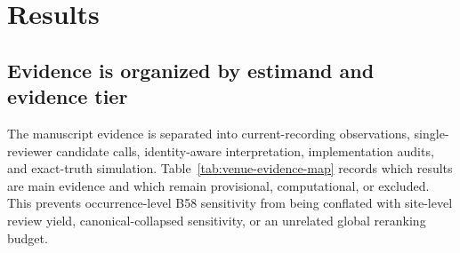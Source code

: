\section{Results}

\subsection{Evidence is organized by estimand and evidence tier}

The manuscript evidence is separated into current-recording observations,
single-reviewer candidate calls, identity-aware interpretation, implementation
audits, and exact-truth simulation. Table~\ref{tab:venue-evidence-map} records
which results are main evidence and which remain provisional, computational, or
excluded. This prevents occurrence-level B58 sensitivity from being conflated
with site-level review yield, canonical-collapsed sensitivity, or an unrelated
global reranking budget.

